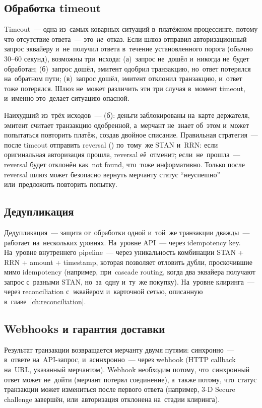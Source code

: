 \subsection*{Обработка timeout}

Timeout~--- одна из~самых коварных ситуаций в~платёжном
процессинге, потому что отсутствие ответа~--- это~\emph{не}~отказ.
Если шлюз отправил авторизационный запрос эквайеру и~не~получил
ответа в~течение установленного порога (обычно 30--60 секунд),
возможны три~исхода: (а)~запрос не~дошёл и~никогда не~будет
обработан; (б)~запрос дошёл, эмитент одобрил транзакцию, но~ответ
потерялся на~обратном пути; (в)~запрос дошёл, эмитент отклонил
транзакцию, и~ответ тоже потерялся. Шлюз не~может различить
эти три случая в~момент timeout, и~именно это~делает ситуацию
опасной.

Наихудший из~трёх исходов~--- (б): деньги заблокированы на~карте
держателя, эмитент считает транзакцию одобренной, а~мерчант
не~знает об~этом и~может попытаться повторить платёж, создав
двойное списание. Правильная стратегия~--- после timeout
отправить reversal () по~тому~же STAN и~RRN:
если оригинальная авторизация прошла, reversal её~отменит;
если~не~прошла~--- reversal будет отклонён как~not found,
что~тоже информативно. Только после reversal шлюз может
безопасно вернуть мерчанту статус \enquote{неуспешно}
или~предложить повторить попытку.

\subsection*{Дедупликация}

Дедупликация~--- защита от~обработки одной и~той~же транзакции
дважды~--- работает на~нескольких уровнях. На~уровне API~---
через idempotency key. На~уровне внутреннего pipeline~--- через
уникальность комбинации STAN + RRN + amount + timestamp,
которая позволяет отловить дубли, проскочившие мимо idempotency
(например, при~cascade routing, когда два эквайера получают
запрос с~разными STAN, но~за~одну и~ту~же покупку).
На~уровне клиринга~--- через reconciliation с~эквайером
и~карточной сетью, описанную
в~главе~\ref{ch:reconciliation}.

\subsection*{Webhooks и гарантия доставки}

Результат транзакции возвращается мерчанту двумя путями:
синхронно~--- в~ответе на~API-запрос, и~асинхронно~---
через webhook (HTTP callback на~URL, указанный мерчантом).
Webhook необходим потому, что~синхронный ответ может
не~дойти (мерчант потерял соединение), а~также потому,
что~статус транзакции может измениться после первого
ответа (например, 3-D Secure challenge завершён,
или~авторизация отклонена на~стадии клиринга).

